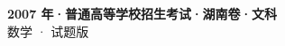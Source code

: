 \documentclass[zihao=-4, a4paper]{ctexart}
\begin{document}
\begin{center}
  {\Large\bfseries 2007 年·普通高等学校招生考试·湖南卷·文科}\\[4pt]
  {\large 数学 · 试题版}
\end{center}
\medskip
{}

\end{document}
